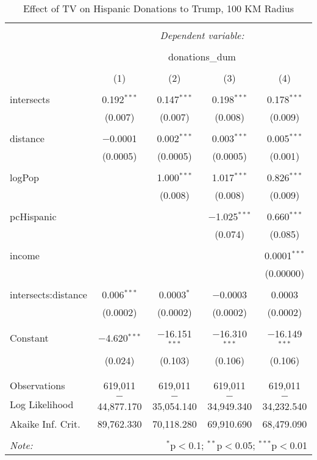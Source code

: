 
\begin{table}[!htbp] \centering 
  \caption{Effect of TV on Hispanic Donations to Trump, 100 KM Radius} 
  \label{} 
\begin{tabular}{@{\extracolsep{-5pt}}lcccc} 
\\[-1.8ex]\hline 
\hline \\[-1.8ex] 
 & \multicolumn{4}{c}{\textit{Dependent variable:}} \\ 
\cline{2-5} 
\\[-1.8ex] & \multicolumn{4}{c}{donations\_dum} \\ 
\\[-1.8ex] & (1) & (2) & (3) & (4)\\ 
\hline \\[-1.8ex] 
 intersects & 0.192$^{***}$ & 0.147$^{***}$ & 0.198$^{***}$ & 0.178$^{***}$ \\ 
  & (0.007) & (0.007) & (0.008) & (0.009) \\ 
  & & & & \\ 
 distance & $-$0.0001 & 0.002$^{***}$ & 0.003$^{***}$ & 0.005$^{***}$ \\ 
  & (0.0005) & (0.0005) & (0.0005) & (0.001) \\ 
  & & & & \\ 
 logPop &  & 1.000$^{***}$ & 1.017$^{***}$ & 0.826$^{***}$ \\ 
  &  & (0.008) & (0.008) & (0.009) \\ 
  & & & & \\ 
 pcHispanic &  &  & $-$1.025$^{***}$ & 0.660$^{***}$ \\ 
  &  &  & (0.074) & (0.085) \\ 
  & & & & \\ 
 income &  &  &  & 0.0001$^{***}$ \\ 
  &  &  &  & (0.00000) \\ 
  & & & & \\ 
 intersects:distance & 0.006$^{***}$ & 0.0003$^{*}$ & $-$0.0003 & 0.0003 \\ 
  & (0.0002) & (0.0002) & (0.0002) & (0.0002) \\ 
  & & & & \\ 
 Constant & $-$4.620$^{***}$ & $-$16.151$^{***}$ & $-$16.310$^{***}$ & $-$16.149$^{***}$ \\ 
  & (0.024) & (0.103) & (0.106) & (0.106) \\ 
  & & & & \\ 
\hline \\[-1.8ex] 
Observations & 619,011 & 619,011 & 619,011 & 619,011 \\ 
Log Likelihood & $-$44,877.170 & $-$35,054.140 & $-$34,949.340 & $-$34,232.540 \\ 
Akaike Inf. Crit. & 89,762.330 & 70,118.280 & 69,910.690 & 68,479.090 \\ 
\hline 
\hline \\[-1.8ex] 
\textit{Note:}  & \multicolumn{4}{r}{$^{*}$p$<$0.1; $^{**}$p$<$0.05; $^{***}$p$<$0.01} \\ 
\end{tabular} 
\end{table} 
